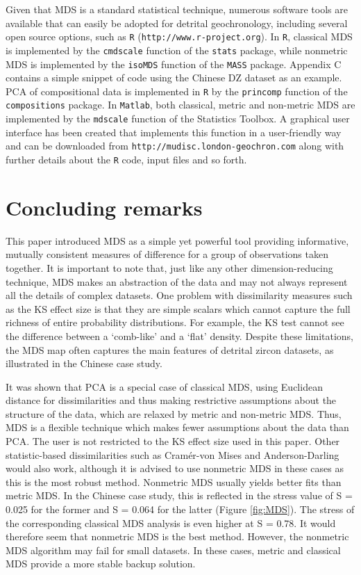 \documentclass[authoryear,preprint,review,12pt]{elsarticle}
\begin{document}
Given that MDS is a standard statistical technique, numerous software
tools are available that can easily be adopted for detrital
geochronology, including several open source options, such as
\texttt{R} (\texttt{http://www.r-project.org}). In \texttt{R},
classical MDS is implemented by the \texttt{cmdscale} function of the
\texttt{stats} package, while nonmetric MDS is implemented by the
\texttt{isoMDS} function of the \texttt{MASS} package. Appendix C
contains a simple snippet of code using the Chinese DZ dataset as an
example.  PCA of compositional data is implemented in \texttt{R} by
the \texttt{princomp} function of the \texttt{compositions} package.
In \texttt{Matlab}, both classical, metric and non-metric MDS are
implemented by the \texttt{mdscale} function of the Statistics
Toolbox. A graphical user interface has been created that implements
this function in a user-friendly way and can be downloaded from
\texttt{http://mudisc.london-geochron.com} along with further details
about the \texttt{R} code, input files and so forth.

\section{Concluding remarks}
\label{sec:conclusions}

This paper introduced MDS as a simple yet powerful tool providing
informative, mutually consistent measures of difference for a group of
observations taken together.  It is important to note that, just like
any other dimension-reducing technique, MDS makes an abstraction of
the data and may not always represent all the details of complex
datasets. One problem with dissimilarity measures such as the KS
effect size is that they are simple scalars which cannot capture the
full richness of entire probability distributions.  For example, the
KS test cannot see the difference between a `comb-like' and a `flat'
density.  Despite these limitations, the MDS map often captures the
main features of detrital zircon datasets, as illustrated in the
Chinese case study.  

It was shown that PCA is a special case of classical MDS, using
Euclidean distance for dissimilarities and thus making restrictive
assumptions about the structure of the data, which are relaxed by
metric and non-metric MDS. Thus, MDS is a flexible technique which
makes fewer assumptions about the data than PCA. The user is not
restricted to the KS effect size used in this paper. Other
statistic-based dissimilarities such as Cram\'{e}r-von Mises and
Anderson-Darling would also work, although it is advised to use
nonmetric MDS in these cases as this is the most robust method.
Nonmetric MDS usually yields better fits than metric MDS.  In the
Chinese case study, this is reflected in the stress value of S = 0.025
for the former and S = 0.064 for the latter (Figure
\ref{fig:MDS}). The stress of the corresponding classical MDS analysis
is even higher at S = 0.78. It would therefore seem that nonmetric MDS
is the best method. However, the nonmetric MDS algorithm may fail for
small datasets. In these cases, metric and classical MDS provide a
more stable backup solution.\\
\end{document}
